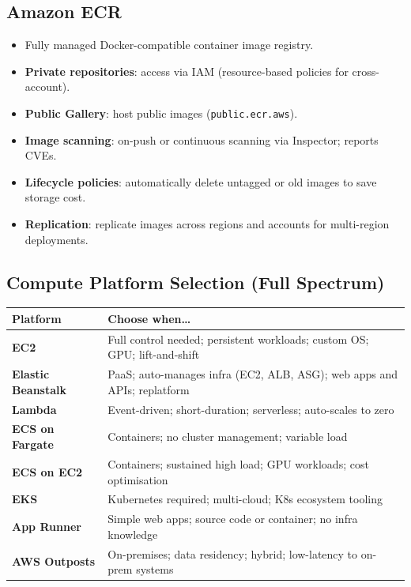 \subsection{Amazon ECR}

\begin{itemize}
  \item Fully managed Docker-compatible container image registry.
  \item \textbf{Private repositories}: access via IAM (resource-based policies for cross-account).
  \item \textbf{Public Gallery}: host public images (\texttt{public.ecr.aws}).
  \item \textbf{Image scanning}: on-push or continuous scanning via Inspector; reports CVEs.
  \item \textbf{Lifecycle policies}: automatically delete untagged or old images to save storage cost.
  \item \textbf{Replication}: replicate images across regions and accounts for multi-region deployments.
\end{itemize}

\subsection{Compute Platform Selection (Full Spectrum)}

\begin{comparebox}[title={Compute platform decision guide}]
\begin{tabular}{@{}p{3.5cm}p{8cm}@{}}
\toprule
\textbf{Platform} & \textbf{Choose when\ldots} \\
\midrule
\textbf{EC2}              & Full control needed; persistent workloads; custom OS; GPU; lift-and-shift \\
\textbf{Elastic Beanstalk} & PaaS; auto-manages infra (EC2, ALB, ASG); web apps and APIs; replatform \\
\textbf{Lambda}           & Event-driven; short-duration; serverless; auto-scales to zero \\
\textbf{ECS on Fargate}   & Containers; no cluster management; variable load \\
\textbf{ECS on EC2}       & Containers; sustained high load; GPU workloads; cost optimisation \\
\textbf{EKS}              & Kubernetes required; multi-cloud; K8s ecosystem tooling \\
\textbf{App Runner}       & Simple web apps; source code or container; no infra knowledge \\
\textbf{AWS Outposts}     & On-premises; data residency; hybrid; low-latency to on-prem systems \\
\bottomrule
\end{tabular}
\end{comparebox}
